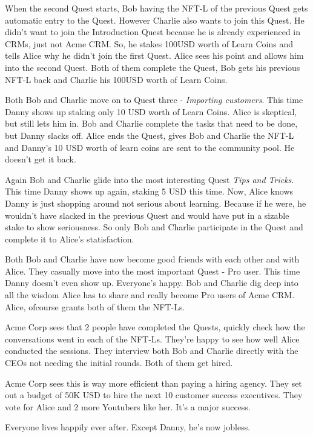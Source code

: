 \documentclass{article}
\begin{document}
    \par
    When the second Quest starts, Bob having the NFT-L of the previous Quest gets automatic entry to the Quest.
    However Charlie also wants to join this Quest. He didn't want to join the Introduction Quest because he is already experienced in CRMs, just not Acme CRM.
    So, he stakes 100USD worth of Learn Coins and tells Alice why he didn't join the first Quest. Alice sees his point and allows him into the second Quest. 
    Both of them complete the Quest, Bob gets his previous NFT-L back and Charlie his 100USD worth of Learn Coins.
    \par
    Both Bob and Charlie move on to Quest three - \textit{Importing customers}. This time Danny shows up staking only 10 USD worth of Learn Coins. Alice is skeptical, but still lets him in.
    Bob and Charlie complete the tasks that need to be done, but Danny slacks off. Alice ends the Quest, gives Bob and Charlie the NFT-L and Danny's 10 USD worth of learn coins are sent to the community pool. He doesn't get it back. 
    \par
    Again Bob and Charlie glide into the most interesting Quest \textit{Tips and Tricks}. This time Danny shows up again, staking 5 USD this time. 
    Now, Alice knows Danny is just shopping around not serious about learning. Because if he were, he wouldn't have slacked in the previous Quest and would have put in a sizable stake to show seriousness.
    So only Bob and Charlie participate in the Quest and complete it to Alice's statisfaction. 
    \par 
    Both Bob and Charlie have now become good friends with each other and with Alice. They casually move into the most important Quest - Pro user. 
    This time Danny doesn't even show up. Everyone's happy. Bob and Charlie dig deep into all the wisdom Alice has to share and really become Pro users of Acme CRM. Alice, ofcourse grants both of them the NFT-Ls.
    \par
    Acme Corp sees that 2 people have completed the Quests, quickly check how the conversations went in each of the NFT-Ls. They're happy to see how well Alice conducted the sessions. 
    They interview both Bob and Charlie directly with the CEOs not needing the initial rounds. Both of them get hired.
    \par
    Acme Corp sees this is way more efficient than paying a hiring agency. They set out a budget of 50K USD to hire the next 10 customer success executives. They vote for Alice and 2 more Youtubers like her.
    It's a major success.
    \par
    Everyone lives happily ever after. Except Danny, he's now jobless.

      
        

      
\end{document}
